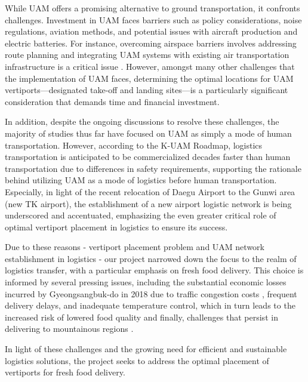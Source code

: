 \documentclass[11pt]{article}
\begin{document}
    While UAM offers a promising alternative to ground transportation, it confronts challenges. Investment in UAM faces barriers such as policy considerations, noise regulations, aviation methods, and potential issues with aircraft production and electric batteries. For instance, overcoming airspace barriers involves addressing route planning and integrating UAM systems with existing air transportation infrastructure is a critical issue \citep{KimKim2023}. However, amongst many other challenges that the implementation of UAM faces, determining the optimal locations for UAM vertiports—designated take-off and landing sites—is a particularly significant consideration that demands time and financial investment.

         

    In addition, despite the ongoing discussions to resolve these challenges, the majority of studies thus far have focused on UAM as simply a mode of human transportation. However, according to the K-UAM Roadmap, logistics transportation is anticipated to be commercialized decades faster than human transportation due to differences in safety requirements, supporting the rationale behind utilizing UAM as a mode of logistics before human transportation. Especially, in light of the recent relocation of Daegu Airport to the Gunwi area (new TK airport), the establishment of a new airport logistic network is being underscored and accentuated, emphasizing the even greater critical role of optimal vertiport placement in logistics to ensure its success.
    
    Due to these reasons - vertiport placement problem and UAM network establishment in logistics - our project narrowed down the focus to the realm of logistics transfer, with a particular emphasis on fresh food delivery. This choice is informed by several pressing issues, including the substantial economic losses incurred by Gyeongsangbuk-do in 2018 due to traffic congestion costs \citep{congestion}, frequent delivery delays, and inadequate temperature control, which in turn leads to the increased risk of lowered food quality \citep{quick_logistic, latency_logistic} and finally, challenges that persist in delivering to mountainous regions \citep{ChoiOh2011}.
    
    In light of these challenges and the growing need for efficient and sustainable logistics solutions, the project seeks to address the optimal placement of vertiports for fresh food delivery. 
    
\end{document}
